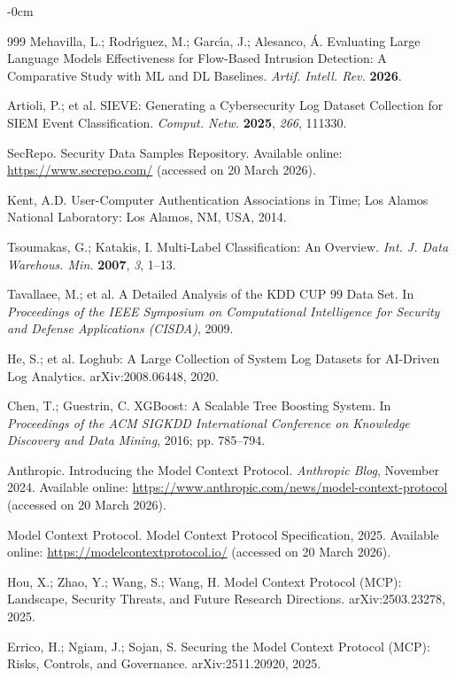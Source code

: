 \documentclass[futureinternet,article,submit,pdftex,moreauthors]{Definitions/mdpi}
\begin{document}
\begin{adjustwidth}{-\extralength}{0cm}
\begin{thebibliography}{999}
Mehavilla, L.; Rodr\'{\i}guez, M.; Garc\'{\i}a, J.; Alesanco, \'{A}.
Evaluating Large Language Models Effectiveness for Flow-Based Intrusion Detection:
A Comparative Study with ML and DL Baselines.
\textit{Artif. Intell. Rev.} \textbf{2026}.

Artioli, P.; et al. SIEVE: Generating a Cybersecurity Log Dataset Collection for SIEM
Event Classification. \textit{Comput. Netw.} \textbf{2025}, \textit{266}, 111330.

SecRepo. Security Data Samples Repository. Available online:
\url{https://www.secrepo.com/} (accessed on 20 March 2026).

Kent, A.D. User-Computer Authentication Associations in Time; Los Alamos National
Laboratory: Los Alamos, NM, USA, 2014.

Tsoumakas, G.; Katakis, I. Multi-Label Classification: An Overview.
\textit{Int. J. Data Warehous. Min.} \textbf{2007}, \textit{3}, 1--13.

Tavallaee, M.; et al. A Detailed Analysis of the KDD CUP 99 Data Set.
In \textit{Proceedings of the IEEE Symposium on Computational Intelligence for Security and
Defense Applications (CISDA)}, 2009.

He, S.; et al. Loghub: A Large Collection of System Log Datasets for AI-Driven Log Analytics.
arXiv:2008.06448, 2020.

Chen, T.; Guestrin, C. XGBoost: A Scalable Tree Boosting System.
In \textit{Proceedings of the ACM SIGKDD International Conference on Knowledge Discovery and
Data Mining}, 2016; pp. 785--794.

Anthropic. Introducing the Model Context Protocol. \textit{Anthropic Blog}, November 2024.
Available online: \url{https://www.anthropic.com/news/model-context-protocol}
(accessed on 20 March 2026).

Model Context Protocol. Model Context Protocol Specification, 2025.
Available online: \url{https://modelcontextprotocol.io/} (accessed on 20 March 2026).

Hou, X.; Zhao, Y.; Wang, S.; Wang, H. Model Context Protocol (MCP): Landscape, Security
Threats, and Future Research Directions. arXiv:2503.23278, 2025.

Errico, H.; Ngiam, J.; Sojan, S. Securing the Model Context Protocol (MCP): Risks,
Controls, and Governance. arXiv:2511.20920, 2025.

\end{thebibliography}

\PublishersNote{}
\end{adjustwidth}
\end{document}
